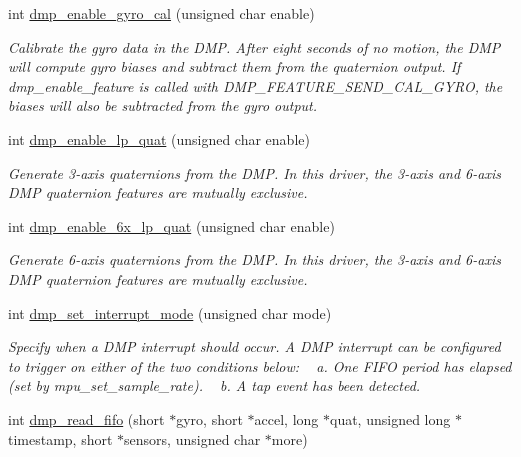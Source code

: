 \begin{DoxyCompactItemize}
int \hyperlink{group___d_r_i_v_e_r_s_ga653ebcec6758f006dd89939e8f3c6ebb}{dmp\+\_\+enable\+\_\+gyro\+\_\+cal} (unsigned char enable)
\begin{DoxyCompactList}\small\item\em Calibrate the gyro data in the D\+MP. After eight seconds of no motion, the D\+MP will compute gyro biases and subtract them from the quaternion output. If {\itshape dmp\+\_\+enable\+\_\+feature} is called with {\itshape D\+M\+P\+\_\+\+F\+E\+A\+T\+U\+R\+E\+\_\+\+S\+E\+N\+D\+\_\+\+C\+A\+L\+\_\+\+G\+Y\+RO}, the biases will also be subtracted from the gyro output. \end{DoxyCompactList}\item 
int \hyperlink{group___d_r_i_v_e_r_s_ga4ee4339b79a58558d121ba8206056394}{dmp\+\_\+enable\+\_\+lp\+\_\+quat} (unsigned char enable)
\begin{DoxyCompactList}\small\item\em Generate 3-\/axis quaternions from the D\+MP. In this driver, the 3-\/axis and 6-\/axis D\+MP quaternion features are mutually exclusive. \end{DoxyCompactList}\item 
int \hyperlink{group___d_r_i_v_e_r_s_gaac712ef33727433f666b3861894873be}{dmp\+\_\+enable\+\_\+6x\+\_\+lp\+\_\+quat} (unsigned char enable)
\begin{DoxyCompactList}\small\item\em Generate 6-\/axis quaternions from the D\+MP. In this driver, the 3-\/axis and 6-\/axis D\+MP quaternion features are mutually exclusive. \end{DoxyCompactList}\item 
int \hyperlink{group___d_r_i_v_e_r_s_gaf10c08103d2aec9aa5555a5694bafced}{dmp\+\_\+set\+\_\+interrupt\+\_\+mode} (unsigned char mode)
\begin{DoxyCompactList}\small\item\em Specify when a D\+MP interrupt should occur. A D\+MP interrupt can be configured to trigger on either of the two conditions below\+: ~\newline
 a. One F\+I\+FO period has elapsed (set by {\itshape mpu\+\_\+set\+\_\+sample\+\_\+rate}). ~\newline
 b. A tap event has been detected. \end{DoxyCompactList}\item 
int \hyperlink{group___d_r_i_v_e_r_s_ga02db5f25359abe84be002c543cdc3803}{dmp\+\_\+read\+\_\+fifo} (short $\ast$gyro, short $\ast$accel, long $\ast$quat, unsigned long $\ast$timestamp, short $\ast$sensors, unsigned char $\ast$more)

\end{DoxyCompactItemize}
